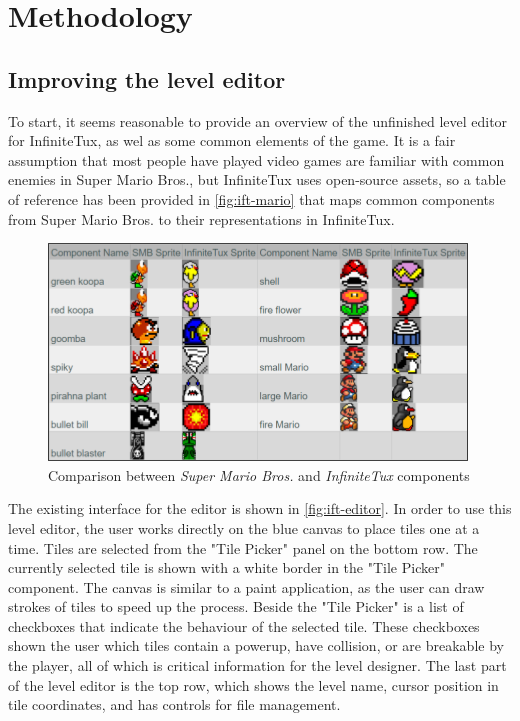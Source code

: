 \chapter{Methodology}

\section{Improving the level editor}

To start, it seems reasonable to provide an overview of the unfinished level editor for
InfiniteTux, as wel as some common elements of the game. It is a fair assumption that most
people have played video games are familiar with common enemies in Super Mario Bros., but
InfiniteTux uses open-source assets, so a table of reference has been provided in \autoref{fig:ift-mario}
that maps common components from Super Mario Bros. to their representations in InfiniteTux.

\begin{figure}[h]
    \centering
    \includegraphics[width=0.8\linewidth]{img/fig10-ift-mario.png}
    \caption{Comparison between \emph{Super Mario Bros.} and \emph{InfiniteTux} components}
    \label{fig:ift-mario}
\end{figure}

The existing interface for the editor is shown in \autoref{fig:ift-editor}. In order to use
this level editor, the user works directly on the blue canvas to place tiles one at a time.
Tiles are selected from the "Tile Picker" panel on the bottom row. The currently selected
tile is shown with a white border in the "Tile Picker" component. The canvas is similar to
a paint application, as the user can draw strokes of tiles to speed up the process. Beside
the "Tile Picker" is a list of checkboxes that indicate the behaviour of the selected tile.
These checkboxes shown the user which tiles contain a powerup, have collision, or are
breakable by the player, all of which is critical information for the level designer. The
last part of the level editor is the top row, which shows the level name, cursor position
in tile coordinates, and has controls for file management.

